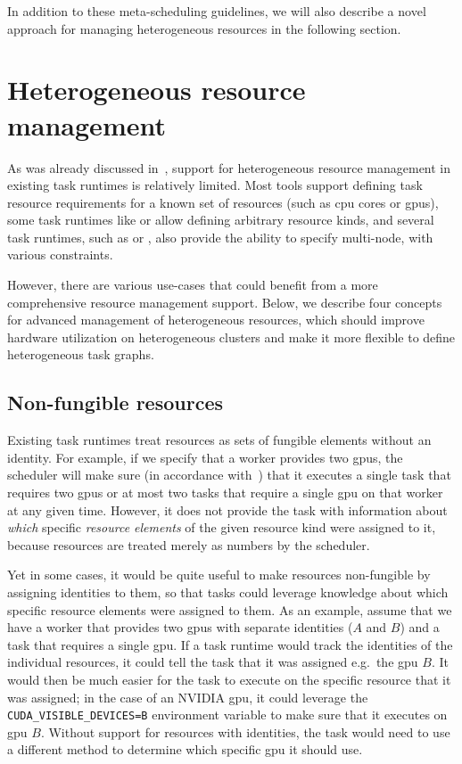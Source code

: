 In addition to these meta-scheduling guidelines, we will also describe a novel approach for
managing heterogeneous resources in the following section.

\section{Heterogeneous resource management}
\label{sec:heterogeneous-resources}
As was already discussed in~, support for heterogeneous resource management
in existing task runtimes is relatively limited. Most tools support defining task resource
requirements for a known set of resources (such as \gls{cpu} cores or
\glspl{gpu}), some task runtimes like \dask{} or
\snakemake{} allow defining arbitrary resource kinds, and several task runtimes, such as \pycompss{} or \ray{},
also provide the ability to specify multi-node, with various constraints.

However, there are various use-cases that could benefit from a more comprehensive resource
management support. Below, we describe four concepts for advanced management of heterogeneous
resources, which should improve hardware utilization on heterogeneous
clusters and make it more flexible to define heterogeneous task graphs.

\subsection{Non-fungible resources}
Existing task runtimes treat resources as sets of fungible elements without an identity. For
example, if we specify that a \dask{} worker provides two \glspl{gpu},
the \dask{} scheduler will make sure (in accordance with~)
that it executes a single task that requires two \glspl{gpu} or at most two tasks that
require a single \gls{gpu} on that worker at any given time. However, it does not
provide the task with information about \emph{which} specific \emph{resource elements} of the
given resource kind were assigned to it, because resources are treated merely as numbers by the
\dask{} scheduler.

Yet in some cases, it would be quite useful to make resources non-fungible by assigning identities
to them, so that tasks could leverage knowledge about which specific resource elements were
assigned to them. As an example, assume that we have a worker that provides two \glspl{gpu} with
separate identities ($A$ and $B$) and a task that requires a
single \gls{gpu}. If a task runtime would track the identities of the individual
resources, it could tell the task that it was assigned e.g.\ the \gls{gpu}
$B$. It would then be much easier for the task to execute on the specific
resource that it was assigned; in the case of an NVIDIA \gls{gpu}, it could leverage
the \texttt{CUDA\_VISIBLE\_DEVICES=B} environment variable to make sure that it executes on
\gls{gpu} $B$. Without support for resources with identities, the
task would need to use a different method to determine which specific \gls{gpu} it
should use.

